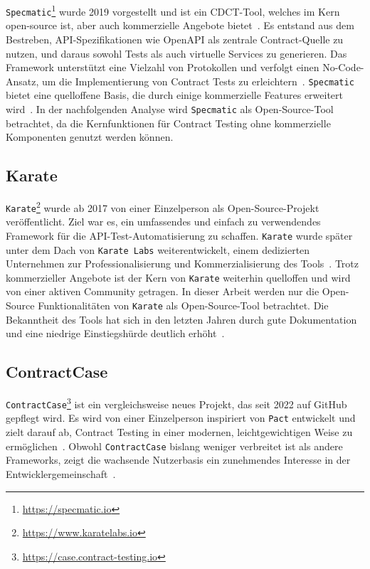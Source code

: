 \texttt{Specmatic}\footnote{\url{https://specmatic.io}} wurde 2019 vorgestellt und ist ein \gls{CDCT}-Tool, welches im Kern open-source ist, aber auch kommerzielle Angebote bietet~\cite{ContractDrivenDevelopment}.
Es entstand aus dem Bestreben, \gls{API}-Spezifikationen wie \gls{OpenAPI} als zentrale Contract-Quelle zu nutzen, und daraus sowohl Tests als auch virtuelle Services zu generieren.
Das Framework unterstützt eine Vielzahl von Protokollen und verfolgt einen No-Code-Ansatz, um die Implementierung von Contract Tests zu erleichtern~\cite{ContractDrivenDevelopment}.
\texttt{Specmatic} bietet eine quelloffene Basis, die durch einige kommerzielle Features erweitert wird~\cite{ContractDrivenDevelopment}.
In der nachfolgenden Analyse wird \texttt{Specmatic} als Open-Source-Tool betrachtet, da die Kernfunktionen für Contract Testing ohne kommerzielle Komponenten genutzt werden können.

\subsection*{Karate}

\texttt{Karate}\footnote{\url{https://www.karatelabs.io}} wurde ab 2017 von einer Einzelperson als Open-Source-Projekt veröffentlicht.
Ziel war es, ein umfassendes und einfach zu verwendendes Framework für die \gls{API}-Test-Automatisierung zu schaffen.
\texttt{Karate} wurde später unter dem Dach von \texttt{Karate Labs} weiterentwickelt, einem dedizierten Unternehmen zur Professionalisierung und Kommerzialisierung des Tools~\cite{OriginKarateKarate}.
Trotz kommerzieller Angebote ist der Kern von \texttt{Karate} weiterhin quelloffen und wird von einer aktiven Community getragen.
In dieser Arbeit werden nur die Open-Source Funktionalitäten von \texttt{Karate} als Open-Source-Tool betrachtet.
Die Bekanntheit des Tools hat sich in den letzten Jahren durch gute Dokumentation und eine niedrige Einstiegshürde deutlich erhöht~\cite{KaratelabsKarate2025}.

\subsection*{ContractCase}

\texttt{ContractCase}\footnote{\url{https://case.contract-testing.io}} ist ein vergleichsweise neues Projekt, das seit 2022 auf GitHub gepflegt wird.
Es wird von einer Einzelperson inspiriert von \texttt{Pact} entwickelt und zielt darauf ab, Contract Testing in einer modernen, leichtgewichtigen Weise zu ermöglichen~\cite{CasecontracttestingContractcase2025}.
Obwohl \texttt{ContractCase} bislang weniger verbreitet ist als andere Frameworks, zeigt die wachsende Nutzerbasis ein zunehmendes Interesse in der Entwicklergemeinschaft~\cite{ContractcaseContractcasejest2025}.

